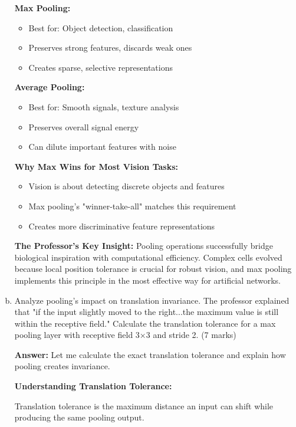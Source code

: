 \documentclass[12pt]{article}
\newcommand{\answer}[1]{{\color{answercolor}\textbf{Answer:} #1}}
\newcommand{\explanation}[1]{{\color{explanationcolor}#1}}
\begin{document}
\begin{enumerate}[(a)]
{    \explanation{
    \textbf{Max Pooling:}
    \begin{itemize}
        \item Best for: Object detection, classification
        \item Preserves strong features, discards weak ones
        \item Creates sparse, selective representations
    \end{itemize}
    
    \textbf{Average Pooling:}
    \begin{itemize}
        \item Best for: Smooth signals, texture analysis
        \item Preserves overall signal energy
        \item Can dilute important features with noise
    \end{itemize}
    
    \textbf{Why Max Wins for Most Vision Tasks:}
    \begin{itemize}
        \item Vision is about detecting discrete objects and features
        \item Max pooling's "winner-take-all" matches this requirement
        \item Creates more discriminative feature representations
    \end{itemize}
    }
    
    \textbf{The Professor's Key Insight:}
    \explanation{
    Pooling operations successfully bridge biological inspiration with computational efficiency. Complex cells evolved because local position tolerance is crucial for robust vision, and max pooling implements this principle in the most effective way for artificial networks.
    }
    }
    
    \item Analyze pooling's impact on translation invariance. The professor explained that "if the input slightly moved to the right...the maximum value is still within the receptive field." Calculate the translation tolerance for a max pooling layer with receptive field 3×3 and stride 2. \hfill (7 marks)
    
    \answer{
    Let me calculate the exact translation tolerance and explain how pooling creates invariance.
    
    \textbf{Understanding Translation Tolerance:}
    
    \explanation{
    Translation tolerance is the maximum distance an input can shift while producing the same pooling output.
    }
    
}
\end{enumerate}
\end{document}
